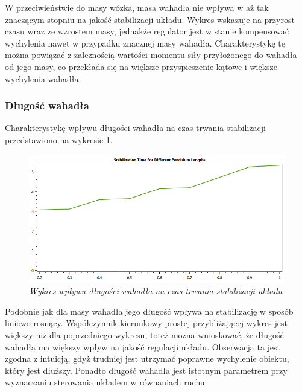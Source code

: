 \documentclass[12pt, twoside, openany]{report}
\theoremstyle{definition}
\begin{document}
W przeciwieństwie do masy wózka, masa wahadła nie wpływa w aż tak znaczącym stopniu na jakość stabilizacji układu. Wykres wskazuje na przyrost czasu wraz ze wzrostem masy, jednakże regulator jest w stanie kompensować wychylenia nawet w przypadku znacznej masy wahadła. Charakterystykę tę można powiązać z zależnością wartości momentu siły przyłożonego do wahadła od jego masy, co przekłada się na większe przyspieszenie kątowe i większe wychylenia wahadła.

\newpage
\subsubsection{Długość wahadła}
Charakterystykę wpływu długości wahadła na czas trwania stabilizacji przedstawiono na wykresie \ref{plot:PendulumLengthQuality}.
\begin{figure}[H]
	\centering
		\includegraphics[width = 350pt]{PendulumLengthQuality} 
		\caption{\textit{Wykres wpływu długości wahadła na czas trwania stabilizacji układu}}
		\label{plot:PendulumLengthQuality}
\end{figure}

Podobnie jak dla masy wahadła jego długość wpływa na stabilizację w sposób liniowo rosnący. Współczynnik kierunkowy prostej przybliżającej wykres jest większy niż dla poprzedniego wykresu, toteż można wnioskować, że długość wahadła ma większy wpływ na jakość regulacji układu. Obserwacja ta jest zgodna z intuicją, gdyż trudniej jest utrzymać poprawne wychylenie obiektu, który jest dłuższy. Ponadto długość wahadła jest istotnym parametrem przy wyznaczaniu sterowania układem w równaniach ruchu. 

\newpage
\end{document}
